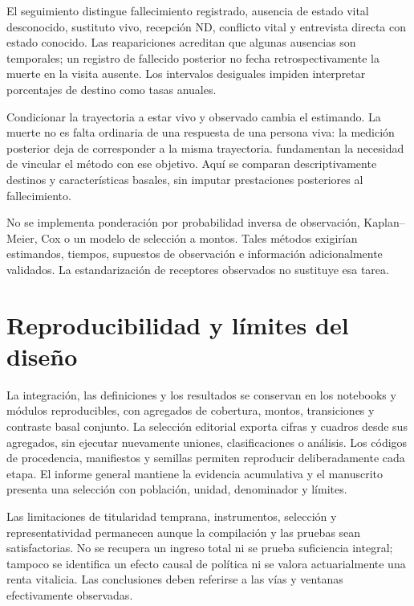 El seguimiento distingue fallecimiento registrado, ausencia de estado vital
desconocido, sustituto vivo, recepción ND, conflicto vital y entrevista directa
con estado conocido. Las reapariciones acreditan que algunas ausencias son
temporales; un registro de fallecido posterior no fecha retrospectivamente la
muerte en la visita ausente. Los intervalos desiguales impiden interpretar
porcentajes de destino como tasas anuales.

Condicionar la trayectoria a estar vivo y observado cambia el estimando.
La muerte no es falta ordinaria de una respuesta de una persona viva:
la medición posterior deja de corresponder a la misma trayectoria.
\citet{kurland2009} fundamentan la necesidad de vincular el método con ese
objetivo. Aquí se comparan descriptivamente destinos y características
basales, sin imputar prestaciones posteriores al fallecimiento.

No se implementa ponderación por probabilidad inversa de observación,
Kaplan--Meier, Cox o un modelo de selección a montos. Tales métodos
exigirían estimandos, tiempos, supuestos de observación e información
adicionalmente validados. La estandarización de receptores observados
no sustituye esa tarea.

\section{Reproducibilidad y límites del diseño}
\label{sec:reproducibilidad}

La integración, las definiciones y los resultados se conservan en los
notebooks y módulos reproducibles, con agregados de cobertura, montos,
transiciones y contraste basal conjunto. La selección
editorial exporta cifras y cuadros desde sus agregados, sin ejecutar nuevamente
uniones, clasificaciones o análisis. Los códigos de procedencia, manifiestos
y semillas permiten reproducir deliberadamente cada etapa. El informe
general mantiene la evidencia acumulativa y el manuscrito presenta una
selección con población, unidad, denominador y límites.

Las limitaciones de titularidad temprana, instrumentos, selección y
representatividad permanecen aunque la compilación y las pruebas sean
satisfactorias. No se recupera un ingreso total ni se prueba suficiencia integral;
tampoco se identifica un efecto causal de política ni se valora actuarialmente una
renta vitalicia. Las conclusiones deben referirse a las vías y ventanas
efectivamente observadas.

